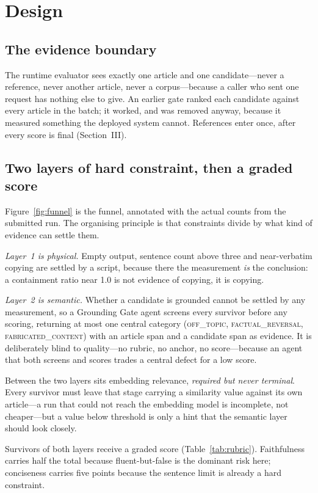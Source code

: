 \documentclass[conference]{IEEEtran}
\begin{document}
\section{Design}

\subsection{The evidence boundary}
The runtime evaluator sees exactly one article and one candidate---never a
reference, never another article, never a corpus---because a caller who
sent one request has nothing else to give. An earlier gate ranked each
candidate against every article in the batch; it worked, and was removed
anyway, because it measured something the deployed system cannot.
References enter once, after every score is final (Section~III).

\subsection{Two layers of hard constraint, then a graded score}
Figure~\ref{fig:funnel} is the funnel, annotated with the actual counts
from the submitted run. The organising principle is that constraints
divide by what kind of evidence can settle them.

\emph{Layer~1 is physical.} Empty output, sentence count above three and
near-verbatim copying are settled by a script, because there the
measurement \emph{is} the conclusion: a containment ratio near 1.0 is not
evidence of copying, it is copying.

\emph{Layer~2 is semantic.} Whether a candidate is grounded cannot be
settled by any measurement, so a Grounding Gate agent screens every
survivor before any scoring, returning at most one central category
(\textsc{off\_topic}, \textsc{factual\_reversal},
\textsc{fabricated\_content}) with an article span and a candidate span as
evidence. It is deliberately blind to quality---no rubric, no anchor, no
score---because an agent that both screens and scores trades a central
defect for a low score.

Between the two layers sits embedding relevance, \emph{required but never
terminal}. Every survivor must leave that stage carrying a similarity
value against its own article---a run that could not reach the embedding
model is incomplete, not cheaper---but a value below threshold is only a
hint that the semantic layer should look closely.

Survivors of both layers receive a graded score
(Table~\ref{tab:rubric}). Faithfulness carries half the total because
fluent-but-false is the dominant risk here; conciseness carries five
points because the sentence limit is already a hard constraint.
\end{document}
